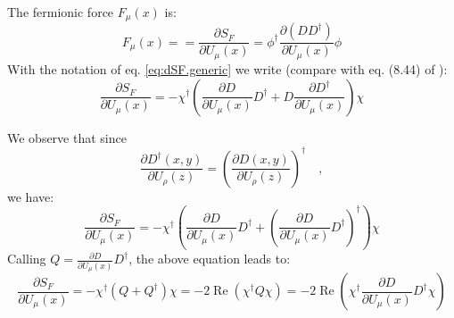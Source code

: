 \documentclass[12pt, a4paper]{article}
\begin{document}
The fermionic force $F_{\mu}(x)$ is:
%
\begin{equation}
F_{\mu}(x) = 
 = \frac{\partial S_F}{\partial U_{\mu}(x)}
 = \phi^\dagger \frac{\partial (D D^{\dagger})}{\partial U_{\mu}(x)} \phi
\end{equation}
%
%
With the notation of eq. \eqref{eq:dSF.generic} we write 
(compare with eq. (8.44) of \cite{gattringer2009quantum}):
%
\begin{equation}
\frac{\partial S_F}{\partial U_{\mu}(x)}
= 
- \chi^{\dagger}
\left( 
\frac{\partial D}{\partial U_{\mu}(x)} D^{\dagger}
+
D \frac{\partial D^{\dagger}}{\partial U_{\mu}(x)}
\right) 
\chi
\end{equation}

We observe that since
%
\begin{equation}
\frac{\partial D^{\dagger}(x,y)}{\partial U_{\rho}(z)} =
\left(
\frac{\partial D(x,y)}{\partial U_{\rho}(z)}
\right)^{\dagger}
\quad ,
\end{equation}
%
we have:
%
\begin{equation}
\frac{\partial S_F}{\partial U_{\mu}(x)}
= 
- \chi^{\dagger}
\left( 
\frac{\partial D}{\partial U_{\mu}(x)} 
D^{\dagger}
+
\left(
\frac{\partial D}{\partial U_{\mu}(x)} 
D^{\dagger} \right)^\dagger
\right) 
\chi
\end{equation}
%
Calling 
$Q = \frac{\partial D}{\partial U_{\mu}(x)}
D^{\dagger}$, 
the above equation leads to:
%
\begin{equation}
\frac{\partial S_F}{\partial U_{\mu}(x)}
= - \chi^{\dagger}( Q + Q^\dagger ) \chi 
= - 2 \operatorname{Re} \left( \chi^{\dagger} Q  \chi \right)
= - 2 \operatorname{Re} \left( \chi^{\dagger}  \frac{\partial D}{\partial U_{\mu}(x)} D^{\dagger}  \chi \right)
\end{equation}
%








\printbibliography
\end{document}
